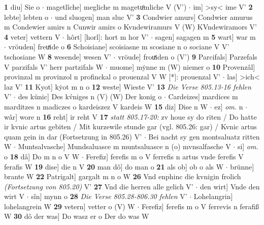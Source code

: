 \documentclass[8pt,a4paper,notitlepage]{article}
\begin{document}
\begin{table}[ht]
\begin{minipage}[t]{0.5\linewidth}
\textbf{1} diu] Sie o  $\cdot$ magetlîche] megliche m magetuͦmliche V (V')  $\cdot$ im] >sy< ime V' \textbf{2} lebte] lebten o  $\cdot$ und sluogen] man sluc V' \textbf{3} Condwier amurs] Condwier amurus m Condewier amirs n Cunwir amirs o Kvndewiramurs V (W) KVndewiramors V' \textbf{4} veter] vettern V  $\cdot$ hôrt] [horl]: hort m hor V'  $\cdot$ sagen] sagagen m \textbf{5} wart] war m  $\cdot$ vröuden] freuͯide o \textbf{6} Schoisiane] scoisiasne m scosiane n o sociane V V' tschosiane W \textbf{8} wesende] wesen V'  $\cdot$ vröude] frouͯiden o (V') \textbf{9} Parcifals] Parzefals V parzifals V' herr partzifals W  $\cdot$ muome] mẏnne m (W) niemer o \textbf{10} Provenzâl] provinzal m provinzol n profinckal o prouenzal V W [*]: prouenzal V'  $\cdot$ las] >ich< laz V' \textbf{11} Kyot] kẏot m n o \textbf{12} weste] Wieste V' \textbf{13} \textit{Die Verse 805.13-16 fehlen} V'   $\cdot$ des künic] Des kv́niges n (V) (W) Der konig o  $\cdot$ Cardeizes] mardices m marditzes n madiczes o kardeiszez V kardeis W \textbf{15} diz] Dise n W  $\cdot$ ez] \textit{om.} n  $\cdot$ wâr] wore n \textbf{16} reht] ir reht V \textbf{17} \textit{statt 805.17-20:} zv houe sy do riten / Do hatte ir kvnic artus gebiten / Mit kurzewile stunde gar (vgl. 805.26: gar) / Kvnic artus quam gein in dar (Fortsetzung in 805.26) V'   $\cdot$ Bei nacht sy gen montsaluatz ritten W  $\cdot$ Muntsalvasche] Mundsaluasce m muntsaluasce n (o) mvnsalfasche V  $\cdot$ si] \textit{om.} o \textbf{18} dâ] Do m n o V W  $\cdot$ Ferefiz] ferefis m o V ferrefis n artus vnde ferefis V ferafis W \textbf{19} dise] die n V \textbf{20} man dô] do man o \textbf{21} als ob] ob o als W  $\cdot$ brünne] brante W \textbf{22} Patrigalt] gargalt m n o W \textbf{26} Vnd enphinc die kvnigin frolich \textit{(Fortsetzung von 805.20)} V' \textbf{27} Vnd die herren alle gelich V'  $\cdot$ den wirt] Vnde den wirt V  $\cdot$ sîn] mynn o \textbf{28} \textit{Die Verse 805.28-806.30 fehlen} V'   $\cdot$ Lohelangrin] lohelangrein W \textbf{29} vetern] vetter o (V) W  $\cdot$ Ferefiz] ferefis m o V ferrevis n ferafiß W \textbf{30} dô der was] Do wasz er o Der do was W \newline
\end{minipage}
\end{table}
\newpage
\end{document}
